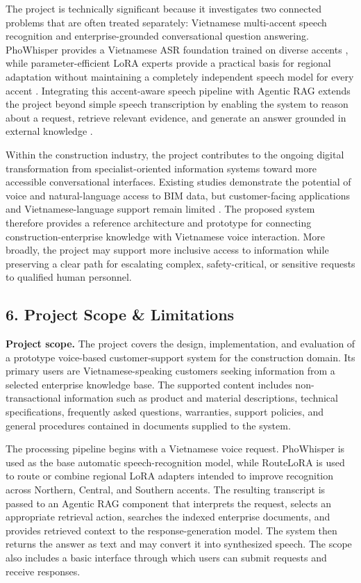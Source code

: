 \documentclass[11pt,a4paper]{article}
\begin{document}
The project is technically significant because it investigates two connected
problems that are often treated separately: Vietnamese multi-accent speech
recognition and enterprise-grounded conversational question answering.
PhoWhisper provides a Vietnamese ASR foundation trained on diverse accents
\cite{le2024}, while parameter-efficient LoRA experts provide a practical basis
for regional adaptation without maintaining a completely independent speech
model for every accent \cite{hu2022,bagat2025}. Integrating this accent-aware
speech pipeline with Agentic RAG extends the project beyond simple speech
transcription by enabling the system to reason about a request, retrieve
relevant evidence, and generate an answer grounded in external knowledge
\cite{lewis2020,yao2023}.

Within the construction industry, the project contributes to the ongoing
digital transformation from specialist-oriented information systems toward
more accessible conversational interfaces. Existing studies demonstrate the
potential of voice and natural-language access to BIM data, but customer-facing
applications and Vietnamese-language support remain limited
\cite{saka2023,shin2021,lin2023}. The proposed system therefore provides a
reference architecture and prototype for connecting construction-enterprise
knowledge with Vietnamese voice interaction. More broadly, the project may
support more inclusive access to information while preserving a clear path for
escalating complex, safety-critical, or sensitive requests to qualified human
personnel.

\subsection{6. Project Scope \& Limitations}

\textbf{Project scope.}
The project covers the design, implementation, and evaluation of a prototype
voice-based customer-support system for the construction domain. Its primary
users are Vietnamese-speaking customers seeking information from a selected
enterprise knowledge base. The supported content includes non-transactional
information such as product and material descriptions, technical
specifications, frequently asked questions, warranties, support policies, and
general procedures contained in documents supplied to the system.

The processing pipeline begins with a Vietnamese voice request. PhoWhisper is
used as the base automatic speech-recognition model, while RouteLoRA is used to
route or combine regional LoRA adapters intended to improve recognition across
Northern, Central, and Southern accents. The resulting transcript is passed to
an Agentic RAG component that interprets the request, selects an appropriate
retrieval action, searches the indexed enterprise documents, and provides
retrieved context to the response-generation model. The system then returns the
answer as text and may convert it into synthesized speech. The scope also
includes a basic interface through which users can submit requests and receive
responses.
\end{document}
